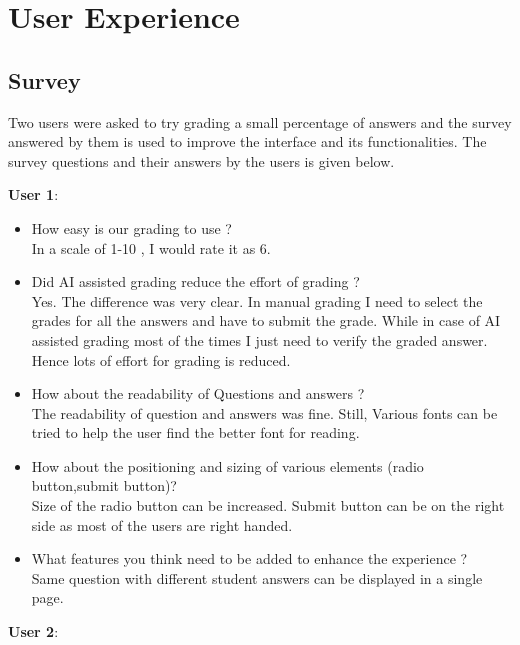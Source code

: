 	\clearpage
	\section{User Experience}
	
	\subsection{Survey}
	
	Two users were asked to try grading a small percentage of answers and the survey answered by them is used to improve the interface and its functionalities. The survey questions and their answers by the users is given below.
	
	\vspace{3mm}
	
	\textbf{User 1}: 
	
	\begin{itemize}
		\item How easy is our grading to use ? \\
		In a scale of 1-10 , I would rate it as 6. 
		\item Did AI assisted grading reduce the effort of grading ? \\
		Yes. The difference was very clear. In manual grading I need to select the grades for all the answers and have to submit the grade. While in case of AI assisted grading most of the times I just need to verify the graded answer. Hence lots of effort for grading is reduced.
		\item How about the readability of Questions and answers ? \\
		The readability of question and answers was fine. Still, Various fonts can be tried to help the user find the better font for reading.
		\item How about the positioning and sizing of various elements (radio button,submit button)? \\
		Size of the radio button can be increased. Submit button can be on the right side as most of the users are right handed. 
		\item What features you think need to be added to enhance the experience ? \\
		Same question with different student answers can be displayed in a single page.
	\end{itemize}
	
	\textbf{User 2}:
	

